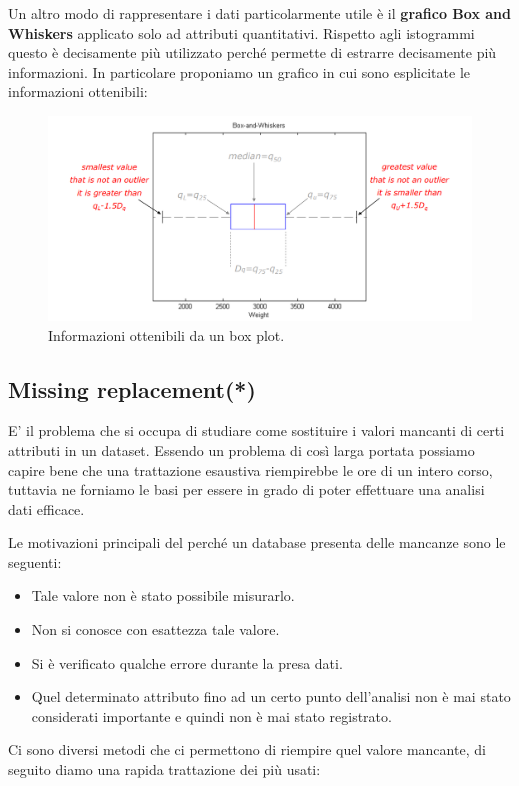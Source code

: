 Un altro modo di rappresentare i dati particolarmente utile è il \textbf{grafico Box and Whiskers} applicato solo ad attributi quantitativi. Rispetto agli istogrammi questo è decisamente più utilizzato perché permette di estrarre decisamente più informazioni. In particolare proponiamo un grafico in cui sono esplicitate le informazioni ottenibili:

\begin{figure}[H]
	\centering
	\includegraphics[height=0.4 \linewidth]{introduction/pict/box_plot.png}
	\caption{Informazioni ottenibili da un box plot.}
\end{figure}


\subsection{Missing replacement(*)}

E' il problema che si occupa di studiare come sostituire i valori mancanti di certi attributi  in un dataset. Essendo un problema di così larga portata possiamo capire bene che una trattazione esaustiva riempirebbe le ore di un intero corso, tuttavia ne forniamo le basi per essere in grado di poter effettuare una analisi dati efficace. 

Le motivazioni principali del perché un database presenta delle mancanze sono le seguenti:
\begin{itemize}
	\item Tale valore non è stato possibile misurarlo.
	\item Non si conosce con esattezza tale valore.
	\item Si è verificato qualche errore durante la presa dati.
	\item Quel determinato attributo fino ad un certo punto dell'analisi non è mai stato considerati importante e quindi non è mai stato registrato.
\end{itemize}

Ci sono diversi metodi che ci permettono di riempire quel valore mancante, di seguito diamo una rapida trattazione dei più usati:

